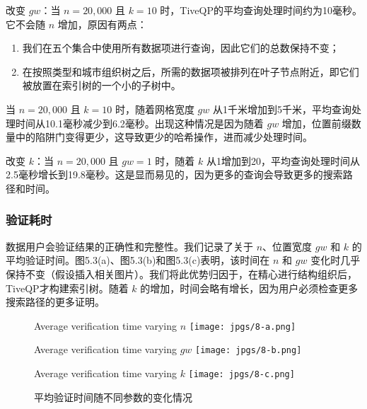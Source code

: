 \documentclass{cumcmthesis}
\numberwithin{equation}{section} %
\numberwithin{figure}{section} %
\numberwithin{table}{section} %
\begin{document}
改变 \(gw\)：当 \(n = 20,000\) 且 \(k = 10\) 时，TiveQP的平均查询处理时间约为10毫秒。它不会随 \(n\) 增加，原因有两点：
\begin{enumerate}
    \item 我们在五个集合中使用所有数据项进行查询，因此它们的总数保持不变；
    \item 在按照类型和城市组织树之后，所需的数据项被排列在叶子节点附近，即它们被放置在索引树的一个小的子树中。 
\end{enumerate}
当 \(n = 20,000\) 且 \(k = 10\) 时，随着网格宽度 \(gw\) 从1千米增加到5千米，平均查询处理时间从10.1毫秒减少到6.2毫秒。出现这种情况是因为随着 \(gw\) 增加，位置前缀数量中的陷阱门变得更少，这导致更少的哈希操作，进而减少处理时间。

改变 \(k\)：当 \(n = 20,000\) 且 \(gw = 1\) 时，随着 \(k\) 从1增加到20，平均查询处理时间从2.5毫秒增长到19.8毫秒。这是显而易见的，因为更多的查询会导致更多的搜索路径和时间。

\subsubsection{验证耗时}
数据用户会验证结果的正确性和完整性。我们记录了关于 \(n\)、位置宽度 \(gw\) 和 \(k\) 的平均验证时间。图5.3(a)、图5.3(b)和图5.3(c)表明，该时间在 \(n\) 和 \(gw\) 变化时几乎保持不变（假设插入相关图片）。我们将此优势归因于，在精心进行结构组织后，TiveQP才构建索引树。随着 \(k\) 的增加，时间会略有增长，因为用户必须检查更多搜索路径的更多证明。

\begin{figure}[h]
    \centering
    \begin{subcaptionbox}{Average verification time varying \(n\)}
        {\texttt{[image: jpgs/8-a.png]}}
    \end{subcaptionbox}
    \hspace{10pt}
    \begin{subcaptionbox}{Average verification time varying \(gw\)}
        {\texttt{[image: jpgs/8-b.png]}}
    \end{subcaptionbox}
    \hspace{10pt}
    \begin{subcaptionbox}{Average verification time varying \(k\)}
        {\texttt{[image: jpgs/8-c.png]}}
    \end{subcaptionbox}
    \caption{平均验证时间随不同参数的变化情况}
    \label{fig:verification_time}
\end{figure}
\end{document}
